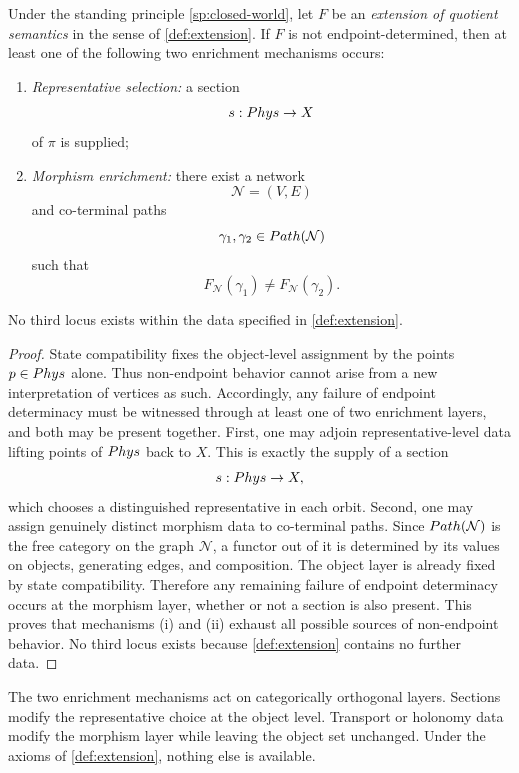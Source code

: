 \begin{theorem}
	\label{thm:two-locus-classification}
	Under the standing principle \cref{sp:closed-world}, let \(F\) be an
	\emph{extension of quotient semantics} in the sense of
	\cref{def:extension}. If \(F\) is not endpoint-determined, then at
	least one of the following two enrichment mechanisms occurs:
	\begin{enumerate}[label=\textup{(\roman*)}]
		\item \emph{Representative selection:} a section
		      \[
			      s:Phys\to X
		      \]
		      of \(\pi\) is supplied;
		\item \emph{Morphism enrichment:} there exist a network
		      \[
			      \mathcal N=(V,E)
		      \]
		      and co-terminal paths
		      \[
			      \gamma_1,\gamma_2\in Path(\mathcal N)
		      \]
		      such that
		      \[
			      F_{\mathcal N}(\gamma_1)\neq F_{\mathcal N}(\gamma_2).
		      \]
	\end{enumerate}
	No third locus exists within the data specified in \cref{def:extension}.
\end{theorem}
\begin{proof}
	State compatibility fixes the object-level assignment by the points
	\(p\in Phys\) alone. Thus non-endpoint behavior cannot arise from a new
	interpretation of vertices as such.
	Accordingly, any failure of endpoint determinacy must be witnessed
	through at least one of two enrichment layers, and both may be
	present together. First, one may adjoin representative-level data
	lifting points of \(Phys\) back to \(X\). This is exactly the supply of a section
	\[
		s:Phys\to X,
	\]
	which chooses a distinguished representative in each orbit.
	Second, one may assign genuinely distinct morphism data to
	co-terminal paths. Since \(Path(\mathcal N)\) is the free category
	on the graph \(\mathcal N\), a functor out of it is determined by its
	values on objects, generating edges, and composition. The object
	layer is already fixed by state compatibility. Therefore any
	remaining failure of endpoint determinacy occurs at the morphism
	layer, whether or not a section is also present.
	This proves that mechanisms \textup{(i)} and \textup{(ii)} exhaust all
	possible sources of non-endpoint behavior. No third locus exists
	because \cref{def:extension} contains no further data.
\end{proof}
\begin{remark}
	The two enrichment mechanisms act on categorically orthogonal layers.
	Sections modify the representative choice at the object level.
	Transport or holonomy data modify the morphism layer while leaving the
	object set unchanged. Under the axioms of \cref{def:extension},
	nothing else is available.
\end{remark}
